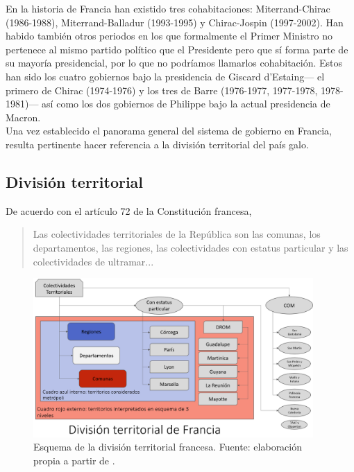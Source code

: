 En la historia de Francia han existido tres cohabitaciones: Miterrand-Chirac (1986-1988), Miterrand-Balladur (1993-1995) y Chirac-Jospin (1997-2002). Han habido también otros periodos en los que formalmente el Primer Ministro no pertenece al mismo partido político que el Presidente pero que sí forma parte de su mayoría presidencial, por lo que no podríamos llamarlos cohabitación. Estos han sido los cuatro gobiernos bajo la presidencia de Giscard d'Estaing--- el primero de Chirac (1974-1976) y los tres de Barre (1976-1977, 1977-1978, 1978-1981)--- así como los dos gobiernos de Philippe bajo la actual presidencia de Macron.\\

Una vez establecido el panorama general del sistema de gobierno en Francia, resulta pertinente hacer referencia a la división territorial del país galo. 

\subsection{División territorial}

De acuerdo con el artículo 72 de la Constitución francesa, 

\begin{quote}
Las colectividades territoriales de la República son las comunas, los departamentos, las regiones, las colectividades con estatus particular y las colectividades de ultramar...
\end{quote}

\begin{figure}[h]
	\centering
	\includegraphics[width = 0.95\textwidth]{Figs/FN_Francia/Div_Terr_Fr_v2}
	\caption{Esquema de la división territorial francesa. Fuente: elaboración propia a partir de \textcite{AN17b}.}
	\label{fig:Div_Terr_Fr}	
\end{figure}

